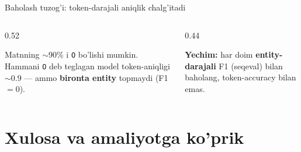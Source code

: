 \documentclass[aspectratio=169,11pt]{beamer}
\begin{document}
\begin{frame}{Baholash tuzog'i: token-darajali aniqlik chalg'itadi}
  \begin{columns}[T]
    \begin{column}{0.52\textwidth}
      \begin{tcolorbox}[warnbox,title={Yuqori accuracy, yomon NER}]
        \small
        Matnning $\sim$90\% i \texttt{O} bo'lishi mumkin. Hammani \texttt{O} deb
        teglagan model token-aniqligi $\sim$0.9 --- ammo \textbf{bironta entity}
        topmaydi (F1$=0$).
      \end{tcolorbox}
    \end{column}
    \begin{column}{0.44\textwidth}
      \begin{tcolorbox}[okbox,top=2pt,bottom=2pt]
        \footnotesize
        \textbf{Yechim:} har doim \textbf{entity-darajali} F1 (seqeval) bilan
        baholang, token-accuracy bilan emas.
      \end{tcolorbox}
    \end{column}
  \end{columns}
\end{frame}

\section[Xulosa]{Xulosa va amaliyotga ko'prik}
\end{document}
